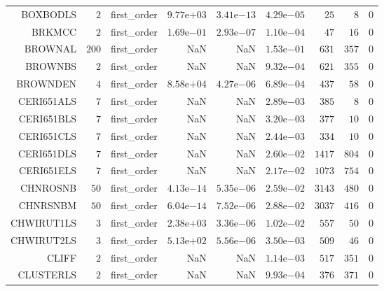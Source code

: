 \begin{longtable}{rrrrrrrrr}
BOXBODLS & \(     2\) & first\_order & \( 9.77\)e\(+03\) & \( 3.41\)e\(-13\) & \( 4.29\)e\(-05\) & \(    25\) & \(     8\) & \(     0\) \\
BRKMCC & \(     2\) & first\_order & \( 1.69\)e\(-01\) & \( 2.93\)e\(-07\) & \( 1.10\)e\(-04\) & \(    47\) & \(    16\) & \(     0\) \\
BROWNAL & \(   200\) & first\_order &       NaN &       NaN & \( 1.53\)e\(-01\) & \(   631\) & \(   357\) & \(     0\) \\
BROWNBS & \(     2\) & first\_order &       NaN &       NaN & \( 9.32\)e\(-04\) & \(   621\) & \(   355\) & \(     0\) \\
BROWNDEN & \(     4\) & first\_order & \( 8.58\)e\(+04\) & \( 4.27\)e\(-06\) & \( 6.89\)e\(-04\) & \(   437\) & \(    58\) & \(     0\) \\
CERI651ALS & \(     7\) & first\_order &       NaN &       NaN & \( 2.89\)e\(-03\) & \(   385\) & \(     8\) & \(     0\) \\
CERI651BLS & \(     7\) & first\_order &       NaN &       NaN & \( 3.20\)e\(-03\) & \(   377\) & \(    10\) & \(     0\) \\
CERI651CLS & \(     7\) & first\_order &       NaN &       NaN & \( 2.44\)e\(-03\) & \(   334\) & \(    10\) & \(     0\) \\
CERI651DLS & \(     7\) & first\_order &       NaN &       NaN & \( 2.60\)e\(-02\) & \(  1417\) & \(   804\) & \(     0\) \\
CERI651ELS & \(     7\) & first\_order &       NaN &       NaN & \( 2.17\)e\(-02\) & \(  1073\) & \(   754\) & \(     0\) \\
CHNROSNB & \(    50\) & first\_order & \( 4.13\)e\(-14\) & \( 5.35\)e\(-06\) & \( 2.59\)e\(-02\) & \(  3143\) & \(   480\) & \(     0\) \\
CHNRSNBM & \(    50\) & first\_order & \( 6.04\)e\(-14\) & \( 7.52\)e\(-06\) & \( 2.88\)e\(-02\) & \(  3037\) & \(   416\) & \(     0\) \\
CHWIRUT1LS & \(     3\) & first\_order & \( 2.38\)e\(+03\) & \( 3.36\)e\(-06\) & \( 1.02\)e\(-02\) & \(   557\) & \(    50\) & \(     0\) \\
CHWIRUT2LS & \(     3\) & first\_order & \( 5.13\)e\(+02\) & \( 5.56\)e\(-06\) & \( 3.50\)e\(-03\) & \(   509\) & \(    46\) & \(     0\) \\
CLIFF & \(     2\) & first\_order &       NaN &       NaN & \( 1.14\)e\(-03\) & \(   517\) & \(   351\) & \(     0\) \\
CLUSTERLS & \(     2\) & first\_order &       NaN &       NaN & \( 9.93\)e\(-04\) & \(   376\) & \(   371\) & \(     0\) \\

\end{longtable}
